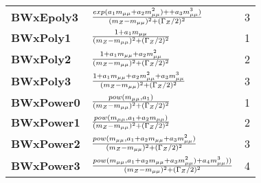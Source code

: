 \documentclass[xcolor={x11names}]{beamer}
\begin{document}
\begin{frame}[fragile,shrink=25]
\begin{table}
{\begin{tabular}{l l c}
\textbf{BWxEpoly3}      &    $\frac{exp(a\sb 1 m\sb {\mu\mu} + a\sb 2m\sb {\mu\mu}^2) + + a\sb 3m\sb {\mu\mu}^3)}{(m\sb Z -m\sb {\mu\mu})^2 + (\Gamma\sb Z/2)^2}                 $   &   3       \\
\textbf{BWxPoly1 }      &    $\frac{1+a\sb 1 m\sb {\mu\mu}}{(m\sb Z -m\sb {\mu\mu})^2 + (\Gamma\sb Z/2)^2}                                                           $   &   1       \\
\textbf{BWxPoly2 }      &    $\frac{1+a\sb 1 m\sb {\mu\mu} + a\sb 2m\sb {\mu\mu}^2}{(m\sb Z -m\sb {\mu\mu})^2 + (\Gamma\sb Z/2)^2}                                         $   &   2       \\
\textbf{BWxPoly3 }      &    $\frac{1+a\sb 1 m\sb {\mu\mu} + a\sb 2m\sb {\mu\mu}^2 + a\sb 3m\sb {\mu\mu}^3}{(m\sb Z -m\sb {\mu\mu})^2 + (\Gamma\sb Z/2)^2}                       $   &   3       \\
\textbf{BWxPower0}      &    $\frac{pow(m\sb {\mu\mu}, a\sb 1 )}{(m\sb Z -m\sb {\mu\mu})^2 + (\Gamma\sb Z/2)^2}                                                      $   &   1       \\
\textbf{BWxPower1}      &    $\frac{pow(m\sb {\mu\mu}, a\sb 1 + a\sb 2 m\sb {\mu\mu})}{(m\sb Z -m\sb {\mu\mu})^2 + (\Gamma\sb Z/2)^2}                                      $   &   2       \\
\textbf{BWxPower2}      &    $\frac{pow(m\sb {\mu\mu}, a\sb 1 + a\sb 2 m\sb {\mu\mu}+ a\sb 3 m\sb {\mu\mu}^2)}{(m\sb Z -m\sb {\mu\mu})^2 + (\Gamma\sb Z/2)^2}                    $   &   3       \\
\textbf{BWxPower3}      &    $\frac{pow(m\sb {\mu\mu}, a\sb 1 + a\sb 2 m\sb {\mu\mu}+ a\sb 3 m\sb {\mu\mu}^2)+ a\sb 4 m\sb {\mu\mu}^3))}{(m\sb Z -m\sb {\mu\mu})^2 + (\Gamma\sb Z/2)^2}$   &   4       \\

\end{tabular}
}

\end{table}

\end{frame}


\end{document}
